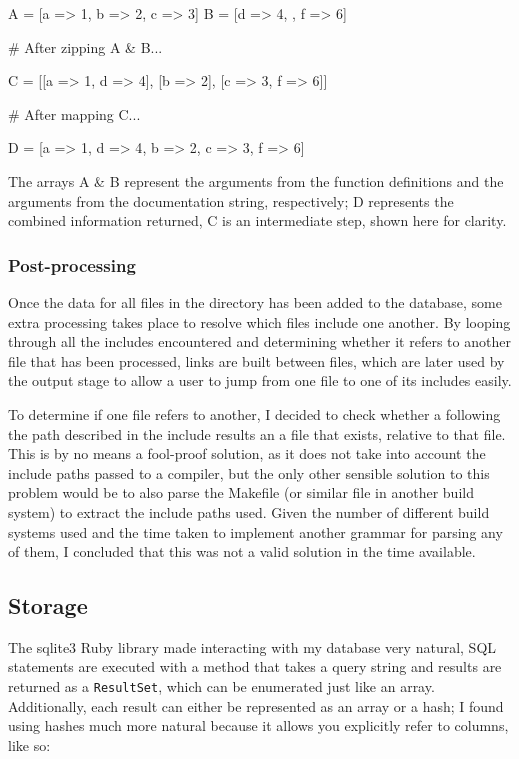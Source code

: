     \begin{code}[language=ruby, gobble=6]
      A = [{a => 1}, {b => 2}, {c => 3}]
      B = [{d => 4}, {}, {f => 6}]

      # After zipping A & B...

      C = [[{a => 1}, {d => 4}], [{b => 2}], [{c => 3}, {f => 6}]]

      # After mapping C...

      D = [{a => 1, d => 4}, {b => 2}, {c => 3, f => 6}]
    \end{code}

    The arrays A \& B represent the arguments from the function definitions
    and the arguments from the documentation string, respectively; D
    represents the combined information returned, C is an intermediate step,
    shown here for clarity.

      \subsubsection{Post-processing}
        Once the data for all files in the directory has been added to the
        database, some extra processing takes place to resolve which files
        include one another. By looping through all the includes encountered
        and determining whether it refers to another file that has been
        processed, links are built between files, which are later used by the
        output stage to allow a user to jump from one file to one of its
        includes easily.

        To determine if one file refers to another, I decided to check whether a
        following the path described in the include results an a file that
        exists, relative to that file. This is by no means a fool-proof
        solution, as it does not take into account the include paths passed to a
        compiler, but the only other sensible solution to this problem would be
        to also parse the Makefile (or similar file in another build system) to
        extract the include paths used. Given the number of different build
        systems used and the time taken to implement another grammar for parsing
        any of them, I concluded that this was not a valid solution in the time
        available.

  \subsection{Storage}

    The sqlite3 Ruby library made interacting with my database very natural, SQL
    statements are executed with a method that takes a query string and results
    are returned as a \lstinline|ResultSet|, which can be enumerated just like
    an array. Additionally, each result can either be represented as an array or
    a hash; I found using hashes much more natural because it allows you
    explicitly refer to columns, like so:

